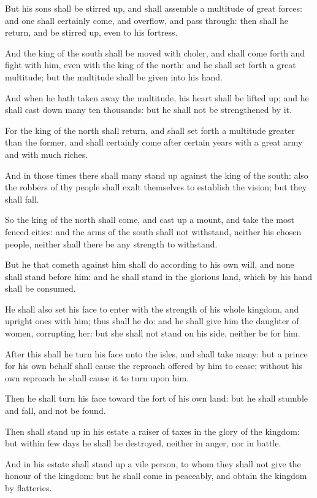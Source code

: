 \verse But his sons shall be stirred up, and shall assemble a multitude of great forces: and one shall certainly come, and overflow, and pass through: then shall he return, and be stirred up, even to his fortress.

\verse And the king of the south shall be moved with choler, and shall come forth and fight with him, even with the king of the north: and he shall set forth a great multitude; but the multitude shall be given into his hand.

\verse And when he hath taken away the multitude, his heart shall be lifted up; and he shall cast down many ten thousands: but he shall not be strengthened by it.

\verse For the king of the north shall return, and shall set forth a multitude greater than the former, and shall certainly come after certain years with a great army and with much riches.

\verse And in those times there shall many stand up against the king of the south: also the robbers of thy people shall exalt themselves to establish the vision; but they shall fall.

\verse So the king of the north shall come, and cast up a mount, and take the most fenced cities: and the arms of the south shall not withstand, neither his chosen people, neither shall there be any strength to withstand.

\verse But he that cometh against him shall do according to his own will, and none shall stand before him: and he shall stand in the glorious land, which by his hand shall be consumed.

\verse He shall also set his face to enter with the strength of his whole kingdom, and upright ones with him; thus shall he do: and he shall give him the daughter of women, corrupting her: but she shall not stand on his side, neither be for him.

\verse After this shall he turn his face unto the isles, and shall take many: but a prince for his own behalf shall cause the reproach offered by him to cease; without his own reproach he shall cause it to turn upon him.

\verse Then he shall turn his face toward the fort of his own land: but he shall stumble and fall, and not be found.

\verse Then shall stand up in his estate a raiser of taxes in the glory of the kingdom: but within few days he shall be destroyed, neither in anger, nor in battle.

\verse And in his estate shall stand up a vile person, to whom they shall not give the honour of the kingdom: but he shall come in peaceably, and obtain the kingdom by flatteries.


